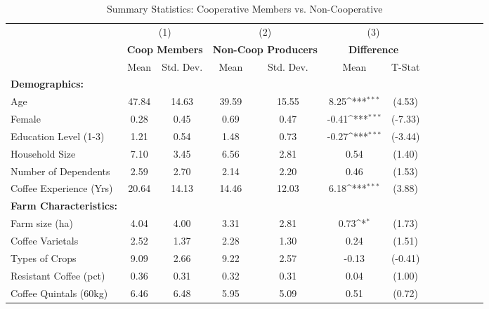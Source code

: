\begin{table}[htbp]\centering \small
\def\sym#1{\ifmmode^{#1}\else\(^{#1}\)\fi}
\caption{Summary Statistics: Cooperative Members vs. Non-Cooperative \label{summary_coop}}
\begin{tabular}{l*{3}{cccc}}
\toprule
                &\multicolumn{2}{c}{(1)}&\multicolumn{2}{c}{(2)}&\multicolumn{2}{c}{(3)}     \\
                &\multicolumn{2}{c}{\textbf{Coop Members}}&\multicolumn{2}{c}{\textbf{Non-Coop Producers}}&\multicolumn{2}{c}{\textbf{Difference}}\\
                &     Mean&Std. Dev.&     Mean&Std. Dev.&     Mean         &   T-Stat\\
\midrule
\textbf{Demographics:}&         &         &         &         &                  &         \\
\addlinespace
Age             &    47.84&    14.63&    39.59&    15.55&     8.25\sym{***}&   (4.53)\\
\addlinespace
Female          &     0.28&     0.45&     0.69&     0.47&    -0.41\sym{***}&  (-7.33)\\
\addlinespace
Education Level (1-3)&     1.21&     0.54&     1.48&     0.73&    -0.27\sym{***}&  (-3.44)\\
\addlinespace
Household Size  &     7.10&     3.45&     6.56&     2.81&     0.54         &   (1.40)\\
\addlinespace
Number of Dependents&     2.59&     2.70&     2.14&     2.20&     0.46         &   (1.53)\\
\addlinespace
Coffee Experience (Yrs)&    20.64&    14.13&    14.46&    12.03&     6.18\sym{***}&   (3.88)\\
\addlinespace
\textbf{Farm Characteristics:}&         &         &         &         &                  &         \\
\addlinespace
Farm size (ha)  &     4.04&     4.00&     3.31&     2.81&     0.73\sym{*}  &   (1.73)\\
\addlinespace
Coffee Varietals&     2.52&     1.37&     2.28&     1.30&     0.24         &   (1.51)\\
\addlinespace
Types of Crops  &     9.09&     2.66&     9.22&     2.57&    -0.13         &  (-0.41)\\
\addlinespace
Resistant Coffee (pct)&     0.36&     0.31&     0.32&     0.31&     0.04         &   (1.00)\\
\addlinespace
Coffee Quintals (60kg)&     6.46&     6.48&     5.95&     5.09&     0.51         &   (0.72)\\

\end{tabular}
\end{table}
